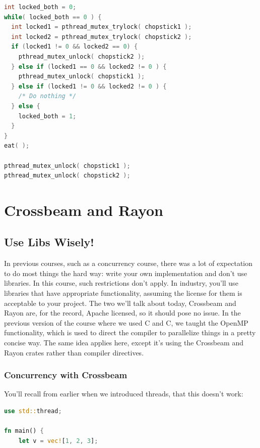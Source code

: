 \documentclass[a4paper]{report}
\newcommand{\CPP}{C\nolinebreak\hspace{-.05em}\raisebox{.4ex}{\tiny\bf +}\nolinebreak\hspace{-.10em}\raisebox{.4ex}{\tiny\bf +}}
\def\CPP{{C\nolinebreak[4]\hspace{-.05em}\raisebox{.4ex}{\tiny\bf ++}}}
\begin{document}
\begin{appendices}
\begin{lstlisting}[language=C]
int locked_both = 0;
while( locked_both == 0 ) {
  int locked1 = pthread_mutex_trylock( chopstick1 );
  int locked2 = pthread_mutex_trylock( chopstick2 );
  if (locked1 != 0 && locked2 == 0) {
    pthread_mutex_unlock( chopstick2 );
  } else if (locked1 == 0 && locked2 != 0 ) {
    pthread_mutex_unlock( chopstick1 );
  } else if (locked1 != 0 && locked2 != 0 ) {
    /* Do nothing */
  } else {
    locked_both = 1;
  }
}
eat( );

pthread_mutex_unlock( chopstick1 );
pthread_mutex_unlock( chopstick2 );
\end{lstlisting}









\chapter{Crossbeam and Rayon}

\section*{Use Libs Wisely!}
In previous courses, such as a concurrency course, there was a lot of expectation to do most things the hard way: write your own implementation and don't use libraries. In this course, such restrictions don't apply. In industry, you'll use libraries that have appropriate functionality, assuming the license for them is acceptable to your project. The two we'll talk about today, Crossbeam and Rayon are, for the record, Apache licensed, so it should pose no issue. In the previous version of the course where we used C and \CPP, we taught the OpenMP functionality, which is used to direct the compiler to parallelize things in a pretty concise way. The same idea applies here, except it's using the Crossbeam and Rayon crates rather than compiler directives.


\subsection*{Concurrency with Crossbeam} 

You'll recall from earlier when we introduced threads, that this doesn't work:
\begin{lstlisting}[language=Rust]
use std::thread;

fn main() {
    let v = vec![1, 2, 3];


\end{lstlisting}
\end{appendices}
\end{document}
